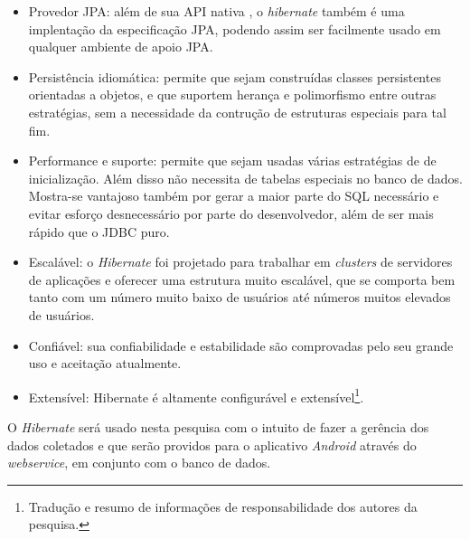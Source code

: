 	\begin{itemize}
	  
	  		\item Provedor JPA: além de sua API nativa , o \textit{hibernate}
	  	também é uma implentação da especificação JPA, podendo assim ser facilmente
	  	usado em qualquer ambiente de apoio JPA.
	  		
	  		\item Persistência idiomática: permite que sejam construídas classes
	  	persistentes orientadas a objetos, e que suportem herança e polimorfismo
	  	entre outras estratégias, sem a necessidade da contrução de estruturas
	  	especiais para tal fim.
	  	
	  		\item Performance e suporte: permite que sejam usadas várias estratégias de
	  	 de inicialização. Além disso não necessita de tabelas especiais no banco de
	  	 dados. Mostra-se vantajoso também por gerar a maior parte do SQL
	  	 necessário e evitar esforço desnecessário por parte do desenvolvedor, além
	  	 de ser mais rápido que o JDBC puro.
	  
	  		\item Escalável: o \textit{Hibernate} foi projetado para trabalhar em
	  	\textit{clusters} de servidores de aplicações e oferecer uma estrutura
	  	muito escalável, que se comporta bem tanto com um número muito baixo de
	  	usuários até números muitos elevados de usuários.

			\item Confiável: sua confiabilidade e estabilidade são comprovadas pelo
		seu grande uso e aceitação atualmente.
			
			\item Extensível: Hibernate é altamente configurável e
		extensível\footnote{Tradução e resumo de informações de responsabilidade dos
		autores da pesquisa.}.
	
	\end{itemize}
	
	\par O \textit{Hibernate} será usado nesta pesquisa com o intuito de fazer a
gerência dos dados coletados e que serão providos para o aplicativo
\textit{Android} através do \textit{webservice}, em conjunto com o banco de
dados.
